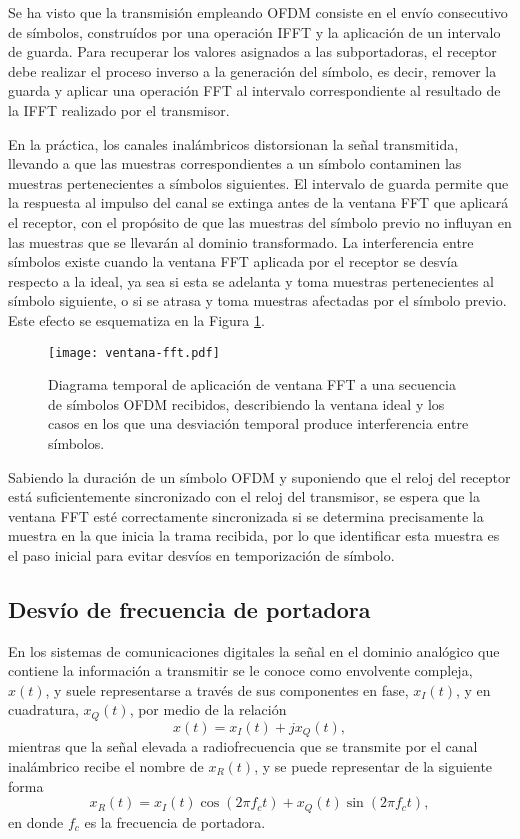 Se ha visto que la transmisión empleando OFDM consiste en el envío consecutivo de símbolos, construídos por una operación IFFT y la aplicación de un intervalo de guarda. Para recuperar los valores asignados a las subportadoras, el receptor debe realizar el proceso inverso a la generación del símbolo, es decir, remover la guarda y aplicar una operación FFT al intervalo correspondiente al resultado de la IFFT realizado por el transmisor.

En la práctica, los canales inalámbricos distorsionan la señal transmitida, llevando a que las muestras correspondientes a un símbolo contaminen las muestras pertenecientes a símbolos siguientes. El intervalo de guarda \color{Red} permite \color{black} que la respuesta al impulso del canal se extinga antes de la ventana FFT que aplicará el receptor, con el propósito de que las muestras del símbolo previo no influyan en las muestras que se llevarán al dominio transformado. La interferencia entre símbolos existe cuando la ventana FFT aplicada por el receptor se desvía respecto a la ideal, ya sea si esta se adelanta y toma muestras pertenecientes al símbolo siguiente, o si se atrasa y toma muestras afectadas por el símbolo previo. Este efecto se esquematiza en la Figura \ref{fig:ventana-fft}.
\begin{figure}[t]
    \centering{}\texttt{[image: ventana-fft.pdf]}
    \caption[Diagrama temporal de aplicación de ventana FFT a una secuencia de símbolos OFDM recibidos.]{Diagrama temporal de aplicación de ventana FFT a una secuencia de símbolos OFDM recibidos, describiendo la ventana ideal y los casos en los que una desviación temporal produce interferencia entre símbolos.\label{fig:ventana-fft}}  
\end{figure}

Sabiendo la duración de un símbolo OFDM y suponiendo que el reloj del receptor está suficientemente sincronizado con el reloj del transmisor, se espera que la ventana FFT esté correctamente sincronizada si se determina precisamente la muestra en la que inicia la trama recibida, por lo que identificar esta muestra es el paso inicial para evitar desvíos en temporización de símbolo.

\subsection{Desvío de frecuencia de portadora}
\label{Ss:ch3-sincronismo-frecuencia}


En los sistemas de comunicaciones digitales la señal en el dominio analógico que contiene la información a transmitir se le conoce como envolvente compleja, $x(t)$, y suele representarse a través de sus componentes en fase, $x_I(t)$, y en cuadratura, $x_Q(t)$, por medio de la relación
\begin{equation}
    x(t) = x_I(t)+jx_Q(t),
\end{equation}
mientras que la señal elevada a radiofrecuencia que se transmite por el canal inalámbrico recibe el nombre de $x_R(t)$, y se puede representar de la siguiente forma
\begin{equation}
    x_R(t) = x_I(t)\cos(2\pi f_c t) + x_Q(t)\sin(2\pi f_c t),
\end{equation}
en donde $f_c$ es la frecuencia de portadora.

